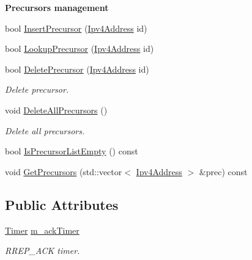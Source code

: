 \begin{Indent}{\bf Precursors management}\par
\begin{DoxyCompactItemize}
\item 
bool \hyperlink{classns3_1_1aodv_1_1RoutingTableEntry_a2334dfcef4b003358fef8da9acc19180}{Insert\+Precursor} (\hyperlink{classns3_1_1Ipv4Address}{Ipv4\+Address} id)
\item 
bool \hyperlink{classns3_1_1aodv_1_1RoutingTableEntry_a853c2c25ca4ffea0208bdc6027c55114}{Lookup\+Precursor} (\hyperlink{classns3_1_1Ipv4Address}{Ipv4\+Address} id)
\item 
bool \hyperlink{classns3_1_1aodv_1_1RoutingTableEntry_a7898282dd424e526691c542fcc98f40f}{Delete\+Precursor} (\hyperlink{classns3_1_1Ipv4Address}{Ipv4\+Address} id)
\begin{DoxyCompactList}\small\item\em Delete precursor. \end{DoxyCompactList}\item 
void \hyperlink{classns3_1_1aodv_1_1RoutingTableEntry_a02e2c727cb0c2aaf5984054c8f44078d}{Delete\+All\+Precursors} ()
\begin{DoxyCompactList}\small\item\em Delete all precursors. \end{DoxyCompactList}\item 
bool \hyperlink{classns3_1_1aodv_1_1RoutingTableEntry_a6e4ae517d6266ebd5bfa55459c14d87c}{Is\+Precursor\+List\+Empty} () const 
\item 
void \hyperlink{classns3_1_1aodv_1_1RoutingTableEntry_abe49597ad755681a5e7cbcbce3f92d62}{Get\+Precursors} (std\+::vector$<$ \hyperlink{classns3_1_1Ipv4Address}{Ipv4\+Address} $>$ \&prec) const 
\end{DoxyCompactItemize}
\end{Indent}
\subsection*{Public Attributes}
\begin{DoxyCompactItemize}
\item 
\hyperlink{classns3_1_1Timer}{Timer} \hyperlink{classns3_1_1aodv_1_1RoutingTableEntry_a08fde93ee8431af5f9e2eadd9e1b93d2}{m\+\_\+ack\+Timer}
\begin{DoxyCompactList}\small\item\em R\+R\+E\+P\+\_\+\+A\+CK timer. \end{DoxyCompactList}\end{DoxyCompactItemize}
